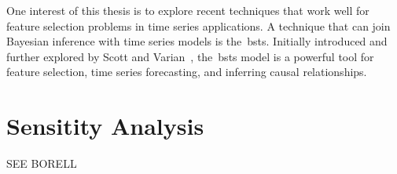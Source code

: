     One interest of this thesis is to explore recent techniques that work well for feature selection problems in
    time series applications.
    A technique that can join Bayesian inference with time series models is the~\gls{bsts}.
    Initially introduced and further explored by Scott and Varian~\cite{scott_predicting_2013, scott_bayesian_2013},
    the~\gls{bsts} model is a powerful tool for feature selection,
time series forecasting, and inferring causal relationships. \\


\section{Sensitity Analysis}
    \label{sec:sens_analysis}

    SEE BORELL



